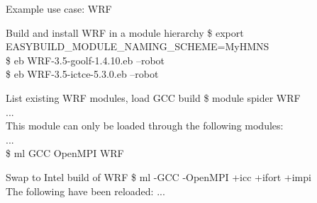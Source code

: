 \documentclass[10pt,xcolor={usenames,dvipsnames}]{beamer}
\begin{document}
\begin{frame}{Example use case: WRF}

\begin{minipage}{0.9\textwidth}
    \begin{exampleblock}{Build and install WRF in a module hierarchy}
        \ttfamily
         \$ export EASYBUILD\_MODULE\_NAMING\_SCHEME=MyHMNS\\
         \$ eb WRF-3.5-goolf-1.4.10.eb --robot\\
         \$ eb WRF-3.5-ictce-5.3.0.eb --robot
    \end{exampleblock}
\end{minipage}

\begin{minipage}{0.9\textwidth}
    \begin{exampleblock}{List existing WRF modules, load GCC build}
        \ttfamily
         \$ module spider WRF\\
         ...\\
         This module can only be loaded through the following modules:\\
         ...\\
         \$ ml GCC OpenMPI WRF
    \end{exampleblock}
\end{minipage}

\begin{minipage}{0.9\textwidth}
    \begin{exampleblock}{Swap to Intel build of WRF}
        \ttfamily
         \$ ml -GCC -OpenMPI +icc +ifort +impi\\
         The following have been reloaded:
         ...
    \end{exampleblock}
\end{minipage}

\end{frame}

\end{document}
